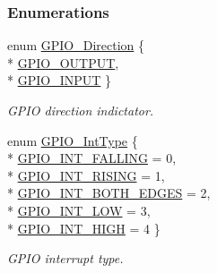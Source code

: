 \subsubsection*{Enumerations}
\begin{DoxyCompactItemize}
\item 
enum \hyperlink{_g_p_i_o_8h_a0c1bff6c02d7155b78f07abd8c31722f}{G\-P\-I\-O\-\_\-\-Direction} \{ \\*
\hyperlink{_g_p_i_o_8h_a0c1bff6c02d7155b78f07abd8c31722faa248e73c1faee9c6f072fd91569cf516}{G\-P\-I\-O\-\_\-\-O\-U\-T\-P\-U\-T}, 
\\*
\hyperlink{_g_p_i_o_8h_a0c1bff6c02d7155b78f07abd8c31722faa1ea38ffc304a6c32480a65b5fec7302}{G\-P\-I\-O\-\_\-\-I\-N\-P\-U\-T}
 \}
\begin{DoxyCompactList}\small\item\em G\-P\-I\-O direction indictator. \end{DoxyCompactList}\item 
enum \hyperlink{_g_p_i_o_8h_abf424f4c82447febc105783bb24d66b0}{G\-P\-I\-O\-\_\-\-Int\-Type} \{ \\*
\hyperlink{_g_p_i_o_8h_abf424f4c82447febc105783bb24d66b0ade1d8166f9c074ae582544391e7ac7f8}{G\-P\-I\-O\-\_\-\-I\-N\-T\-\_\-\-F\-A\-L\-L\-I\-N\-G} = 0, 
\\*
\hyperlink{_g_p_i_o_8h_abf424f4c82447febc105783bb24d66b0abd74c575d6e2c772ec9205c9509913ab}{G\-P\-I\-O\-\_\-\-I\-N\-T\-\_\-\-R\-I\-S\-I\-N\-G} = 1, 
\\*
\hyperlink{_g_p_i_o_8h_abf424f4c82447febc105783bb24d66b0a6bcaacff5846db83efc1b62e95691e48}{G\-P\-I\-O\-\_\-\-I\-N\-T\-\_\-\-B\-O\-T\-H\-\_\-\-E\-D\-G\-E\-S} = 2, 
\\*
\hyperlink{_g_p_i_o_8h_abf424f4c82447febc105783bb24d66b0af4dfbf12ab52e3d51a70f9d82b867e37}{G\-P\-I\-O\-\_\-\-I\-N\-T\-\_\-\-L\-O\-W} = 3, 
\\*
\hyperlink{_g_p_i_o_8h_abf424f4c82447febc105783bb24d66b0adf097efcf757be9ab3159169c0d3e649}{G\-P\-I\-O\-\_\-\-I\-N\-T\-\_\-\-H\-I\-G\-H} = 4
 \}
\begin{DoxyCompactList}\small\item\em G\-P\-I\-O interrupt type. \end{DoxyCompactList}\end{DoxyCompactItemize}
